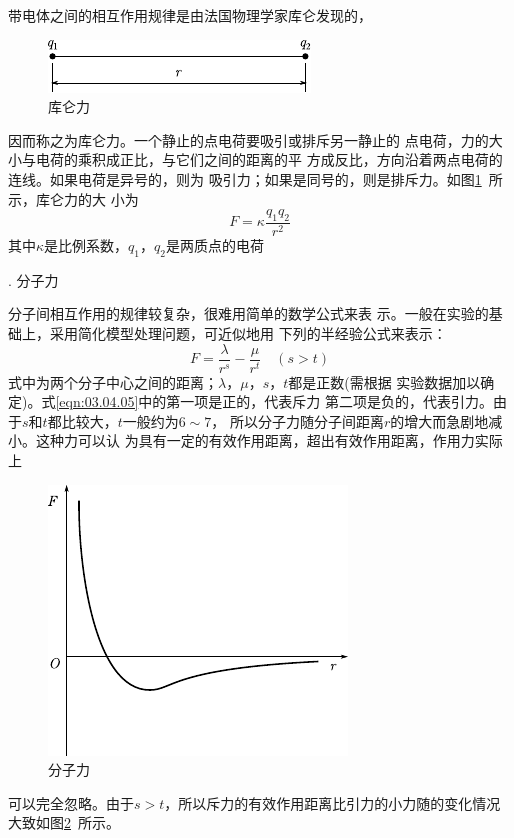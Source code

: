 带电体之间的相互作用规律是由法国物理学家库仑发现的，
\begin{figure}
    \includegraphics{figure/fig03.06}
    \caption{库仑力}
    \label{fig:03.06}
\end{figure}
因而称之为库仑力。一个静止的点电荷要吸引或排斥另一静止的
点电荷，力的大小与电荷的乘积成正比，与它们之间的距离的平
方成反比，方向沿着两点电荷的连线。如果电荷是异号的，则为
吸引力；如果是同号的，则是排斥力。如图\ref{fig:03.06}~所示，库仑力的大
小为
\begin{equation}\label{eqn:03.04.04}
    F = \kappa \frac { q _ { 1 } q _ { 2 } } { r ^ { 2 } }
\end{equation}
其中$ \kappa $是比例系数，$  q _ { 1 } $，$  q _ { 2 } $是两质点的电荷

. 分子力 \normalfont

分子间相互作用的规律较复杂，很难用简单的数学公式来表
示。一般在实验的基础上，采用简化模型处理问题，可近似地用
下列的半经验公式来表示：
\begin{equation}\label{eqn:03.04.05}
    F = \frac { \lambda } { r ^ { s } } - \frac { \mu } { r ^ t } \quad ( s > t )
\end{equation}
式中为两个分子中心之间的距离；$\lambda$，$\mu$，$ s $，$ t $都是正数(需根据
实验数据加以确定)。式\eqref{eqn:03.04.05}中的第一项是正的，代表斥力
第二项是负的，代表引力。由于$ s $和$ t $都比较大，$ t $一般约为$ 6\sim7 $，
所以分子力随分子间距离$ r $的增大而急剧地减小。这种力可以认
为具有一定的有效作用距离，超出有效作用距离，作用力实际上
\begin{figure}
    \includegraphics{figure/fig03.07}
    \caption{分子力}
    \label{fig:03.07}
\end{figure}
可以完全忽略。由于$  s > t   $，所以斥力的有效作用距离比引力的小力随的变化情况大致如图\ref{fig:03.07}~所示。

